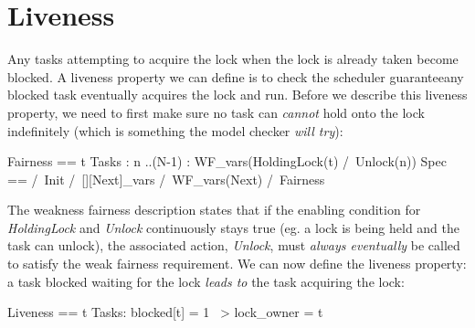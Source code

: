 \section{Liveness}

Any tasks attempting to acquire the lock when the lock is already taken become blocked. A liveness property we can define is to check the scheduler guaranteeany blocked task eventually acquires the lock and run. Before we describe this
liveness property, we need to first make sure no task can \textit{cannot} hold
onto the lock indefinitely (which is something the model checker \textit{will
try}):\newline

\begin{tla}
Fairness ==
    \A t \in Tasks :
        \A n ..(N-1) :
            WF_vars(HoldingLock(t) /\ Unlock(n))
Spec ==
  /\ Init
  /\ [][Next]_vars
  /\ WF_vars(Next)
  /\ Fairness 
\end{tla}
\begin{tlatex}
%
%
%
%
%
%
%
%
%
\end{tlatex}
\newline

The weakness fairness description states that if the enabling condition for
\textit{HoldingLock} and \textit{Unlock} continuously stays true (eg. a lock is
being held and the task can unlock), the associated action, \textit{Unlock},
must \textit{always eventually} be called to satisfy the weak fairness
requirement. We can now define the liveness property: a task blocked waiting
for the lock \textit{leads to} the task acquiring the lock:\newline

\begin{tla}
Liveness == 
    \A t \in Tasks:
        blocked[t] = 1 ~> lock_owner = t
\end{tla}
\begin{tlatex}
%
%
%
\end{tlatex}
\newline
